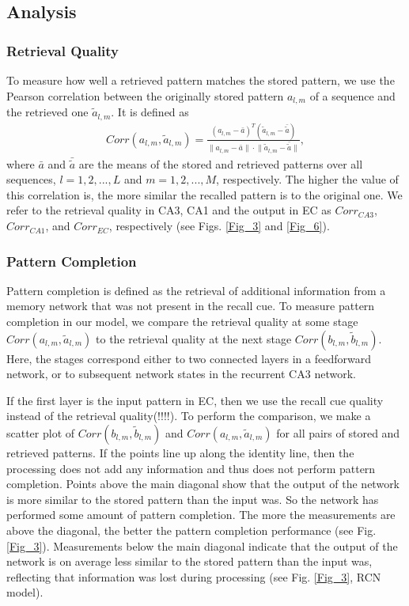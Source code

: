 \documentclass[utf8]{frontiersSCNS} %
\begin{document}
\subsection{Analysis}

\subsubsection{Retrieval Quality}
To measure how well a retrieved pattern matches the stored pattern, we use the Pearson correlation between the originally stored pattern $a_{l, m}$ of a sequence  and the retrieved one $\tilde{a}_{l, m}$. It is defined as
\begin{align*}
	Corr(a_{l, m},\tilde{a}_{l, m})  = \frac{(a_{l, m} -\bar{a})^T(\tilde{a}_{l, m} -\bar{\tilde{a}})}
{\lVert{a_{l, m} -\bar{a}} \rVert \cdot \lVert{\tilde{a}_{l, m} -\bar{\tilde{a}}}\rVert },
\end{align*}     
where $\bar{a}$ and $\bar{\tilde{a}}$ are the means of the stored and retrieved patterns over all sequences, $l = 1,2, ..., L$ and $m = 1,2, ..., M$, respectively. The higher the value of this correlation is, the more similar the recalled pattern is to the original one. We refer to the retrieval quality in CA3, CA1 and the output in EC as $Corr_{CA3}$, $Corr_{CA1}$, and $Corr_{EC}$, respectively (see Figs. \ref{Fig_3} and \ref{Fig_6}).

\subsubsection{Pattern Completion}
Pattern completion is defined as the retrieval of additional information from a memory network that was not present in the recall cue. To measure pattern completion in our model, we compare the retrieval quality at some stage $Corr(a_{l, m},\tilde{a}_{l, m})$ to the retrieval quality at the next stage $Corr(b_{l, m},\tilde{b}_{l, m})$. Here, the stages correspond either to two connected layers in a feedforward network, or to subsequent network states in the recurrent CA3 network. 

If the first layer is the input pattern in EC, then we use the recall cue quality instead of the retrieval quality(!!!!).
%
To perform the comparison, we make a scatter plot of
$Corr(b_{l, m},\tilde{b}_{l, m})$ and
$Corr(a_{l, m},\tilde{a}_{l, m})$ 
for all pairs of stored and retrieved patterns.
If the points line up along the identity line, then the processing does not add any information and thus does not perform pattern completion. Points above the main diagonal show that the output of the network is more similar to the stored pattern than the input was. So the network has performed some amount of pattern completion. The more the measurements are above the diagonal, the better the pattern completion performance (see Fig. \ref{Fig_3}). Measurements below the main diagonal indicate that the output of the network is on average less similar to the stored pattern than the input was, reflecting that information was lost during processing (see Fig. \ref{Fig_3}, RCN model).
\end{document}
